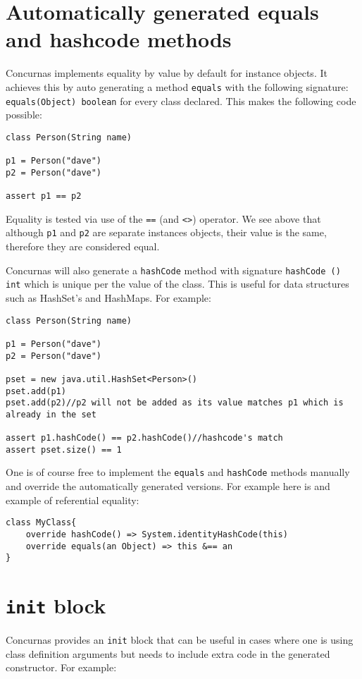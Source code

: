 \documentclass[conc-doc]{subfiles}
\begin{document}
\section{Automatically generated equals and hashcode methods}
\label{autoGeneqAndHash}
Concurnas implements equality by value by default for instance objects. It achieves this by auto generating a method \lstinline{equals} with the following signature: \lstinline{equals(Object) boolean} for every class declared. This makes the following code possible:

\begin{lstlisting}
class Person(String name)

p1 = Person("dave")
p2 = Person("dave")

assert p1 == p2
\end{lstlisting}

Equality is tested via use of the \lstinline{==} (and \lstinline{<>}) operator. We see above that although \lstinline{p1} and \lstinline{p2} are separate instances objects, their value is the same, therefore they are considered equal. 

Concurnas will also generate a \lstinline{hashCode} method with signature \lstinline{hashCode () int} which is unique per the value of the class. This is useful for data structures such as HashSet's and HashMaps. For example:

\begin{lstlisting}
class Person(String name)

p1 = Person("dave")
p2 = Person("dave")

pset = new java.util.HashSet<Person>()
pset.add(p1)
pset.add(p2)//p2 will not be added as its value matches p1 which is already in the set

assert p1.hashCode() == p2.hashCode()//hashcode's match
assert pset.size() == 1
\end{lstlisting}

One is of course free to implement the \lstinline{equals} and \lstinline{hashCode} methods manually and override the automatically generated versions. For example here is and example of referential equality:

\begin{lstlisting}
class MyClass{
	override hashCode() => System.identityHashCode(this)
	override equals(an Object) => this &== an
}
\end{lstlisting}

\section{\lstinline{init} block}
Concurnas provides an \lstinline{init} block that can be useful in cases where one is using class definition arguments but needs to include extra code in the generated constructor. For example:
\end{document}
